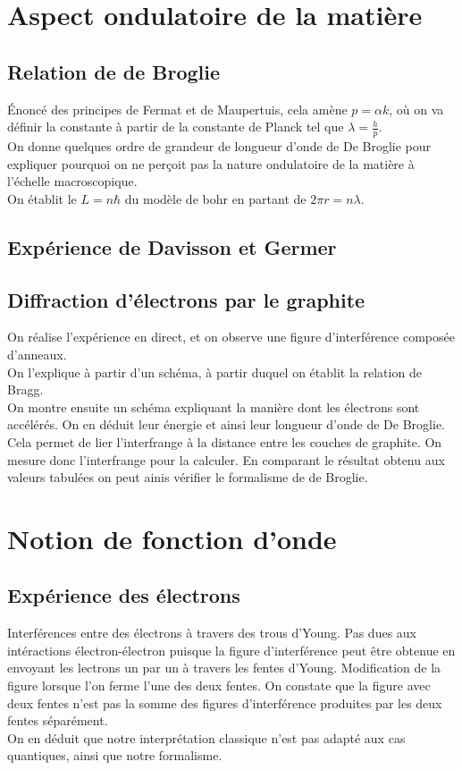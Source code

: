 \documentclass[12pt,prb,aps,epsf]{report}
\begin{document}
\section{Aspect ondulatoire de la matière}

\subsection{Relation de de Broglie}

Énoncé des principes de Fermat et de Maupertuis, cela amène $p =\alpha k$, où on va définir la constante à partir de la constante de Planck tel que $\lambda = \frac{h}{p}$.\\
On donne quelques ordre de grandeur de longueur d'onde de De Broglie pour expliquer pourquoi on ne perçoit pas la nature ondulatoire de la matière à l'échelle macroscopique.\\
On établit le $L= n \hbar$ du modèle de bohr en partant de $2\pi r = n\lambda$.

\subsection{Expérience de Davisson et Germer}
\subsection{Diffraction d'électrons par le graphite}
On réalise l'expérience en direct, et on observe une figure d'interférence composée d'anneaux.\\
On l'explique à partir d'un schéma, à partir duquel on établit la relation de Bragg.\\
On montre ensuite un schéma expliquant la manière dont les électrons sont accélérés. On en déduit leur énergie et ainsi leur longueur d'onde de De Broglie. Cela permet de lier l'interfrange à la distance entre les couches de graphite. On mesure donc l'interfrange pour la calculer. En comparant le résultat obtenu aux valeurs tabulées on peut ainis vérifier le formalisme de de Broglie.

\section{Notion de fonction d'onde}
\subsection{Expérience des électrons}

Interférences entre des électrons à travers des trous d'Young. Pas dues aux intéractions électron-électron puisque la figure d'interférence peut être obtenue en envoyant les lectrons un par un à travers les fentes d'Young. Modification de la figure lorsque l'on ferme l'une des deux fentes. On constate que la figure avec deux fentes n'est pas la somme des figures d'interférence produites par les deux fentes séparément.\\
On en déduit que notre interprétation classique n'est pas adapté aux cas quantiques, ainsi que notre formalisme.
\end{document}
